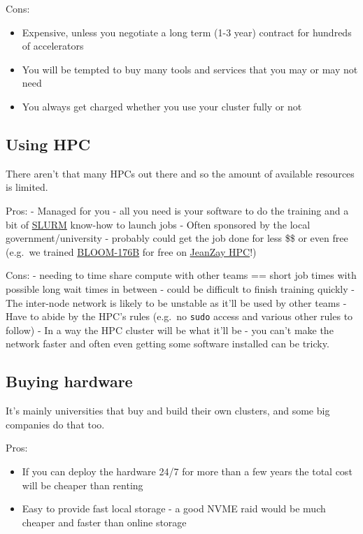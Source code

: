 \documentclass[
]{report}
\providecommand{\tightlist}{%
  \setlength{\itemsep}{0pt}\setlength{\parskip}{0pt}}\usepackage{longtable,booktabs,array}
\begin{document}
Cons:

\begin{itemize}
\tightlist
\item
  Expensive, unless you negotiate a long term (1-3 year) contract for
  hundreds of accelerators
\item
  You will be tempted to buy many tools and services that you may or may
  not need
\item
  You always get charged whether you use your cluster fully or not
\end{itemize}

\subsection{Using HPC}\label{using-hpc}

There aren't that many HPCs out there and so the amount of available
resources is limited.

Pros: - Managed for you - all you need is your software to do the
training and a bit of \href{../orchestration/slurm}{SLURM} know-how to
launch jobs - Often sponsored by the local government/university -
probably could get the job done for less \$\$ or even free (e.g.~we
trained \href{https://huggingface.co/bigscience/bloom}{BLOOM-176B} for
free on \href{http://www.idris.fr/eng/jean-zay/}{JeanZay HPC}!)

Cons: - needing to time share compute with other teams == short job
times with possible long wait times in between - could be difficult to
finish training quickly - The inter-node network is likely to be
unstable as it'll be used by other teams - Have to abide by the HPC's
rules (e.g.~no \texttt{sudo} access and various other rules to follow) -
In a way the HPC cluster will be what it'll be - you can't make the
network faster and often even getting some software installed can be
tricky.

\subsection{Buying hardware}\label{buying-hardware}

It's mainly universities that buy and build their own clusters, and some
big companies do that too.

Pros:

\begin{itemize}
\tightlist
\item
  If you can deploy the hardware 24/7 for more than a few years the
  total cost will be cheaper than renting
\item
  Easy to provide fast local storage - a good NVME raid would be much
  cheaper and faster than online storage
\end{itemize}
\end{document}
